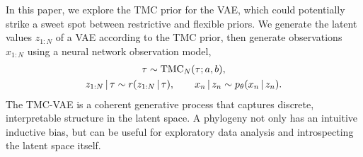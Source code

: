 In this paper, we explore the TMC prior for the VAE, which could potentially strike a sweet spot between restrictive and flexible priors.
We generate the latent values $z_{1:N}$ of a VAE according to the TMC prior, then generate observations $x_{1:N}$ using a neural network observation model,
\begin{gather}
        \tau \sim \mathrm{TMC}_N(\tau; a, b), \\
        z_{1:N} \,|\, \tau \sim r(z_{1:N} \,|\, \tau),
        \qquad
        x_n \,|\, z_n \sim p_\theta(x_n \,|\, z_n).
\end{gather}
The TMC-VAE is a coherent
generative process that captures
discrete, interpretable structure in the latent space.
A phylogeny not only has an intuitive inductive bias,
but can be useful for
exploratory data analysis
and introspecting the latent space itself.


